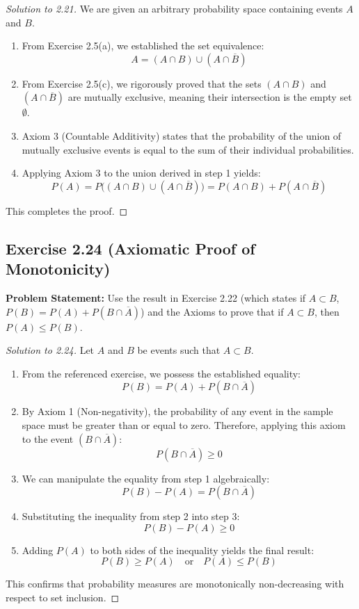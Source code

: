 \documentclass[12pt]{article}
\begin{document}
\begin{proof}[Solution to 2.21]
We are given an arbitrary probability space containing events $A$ and $B$.
\begin{enumerate}
    \item From Exercise 2.5(a), we established the set equivalence:
    \[ A = (A \cap B) \cup (A \cap \overline{B}) \]
    \item From Exercise 2.5(c), we rigorously proved that the sets $(A \cap B)$ and $(A \cap \overline{B})$ are mutually exclusive, meaning their intersection is the empty set $\emptyset$.
    \item Axiom 3 (Countable Additivity) states that the probability of the union of mutually exclusive events is equal to the sum of their individual probabilities.
    \item Applying Axiom 3 to the union derived in step 1 yields:
    \[ P(A) = P\Big( (A \cap B) \cup (A \cap \overline{B}) \Big) = P(A \cap B) + P(A \cap \overline{B}) \]
\end{enumerate}
This completes the proof.
\end{proof}

\subsection*{Exercise 2.24 (Axiomatic Proof of Monotonicity)}
\textbf{Problem Statement:} Use the result in Exercise 2.22 (which states if $A \subset B$, $P(B) = P(A) + P(B \cap \overline{A})$) and the Axioms to prove that if $A \subset B$, then $P(A) \leq P(B)$.

\begin{proof}[Solution to 2.24]
Let $A$ and $B$ be events such that $A \subset B$.
\begin{enumerate}
    \item From the referenced exercise, we possess the established equality:
    \[ P(B) = P(A) + P(B \cap \overline{A}) \]
    \item By Axiom 1 (Non-negativity), the probability of any event in the sample space must be greater than or equal to zero. Therefore, applying this axiom to the event $(B \cap \overline{A})$:
    \[ P(B \cap \overline{A}) \geq 0 \]
    \item We can manipulate the equality from step 1 algebraically:
    \[ P(B) - P(A) = P(B \cap \overline{A}) \]
    \item Substituting the inequality from step 2 into step 3:
    \[ P(B) - P(A) \geq 0 \]
    \item Adding $P(A)$ to both sides of the inequality yields the final result:
    \[ P(B) \geq P(A) \quad \text{or} \quad P(A) \leq P(B) \]
\end{enumerate}
This confirms that probability measures are monotonically non-decreasing with respect to set inclusion.
\end{proof}
\end{document}
